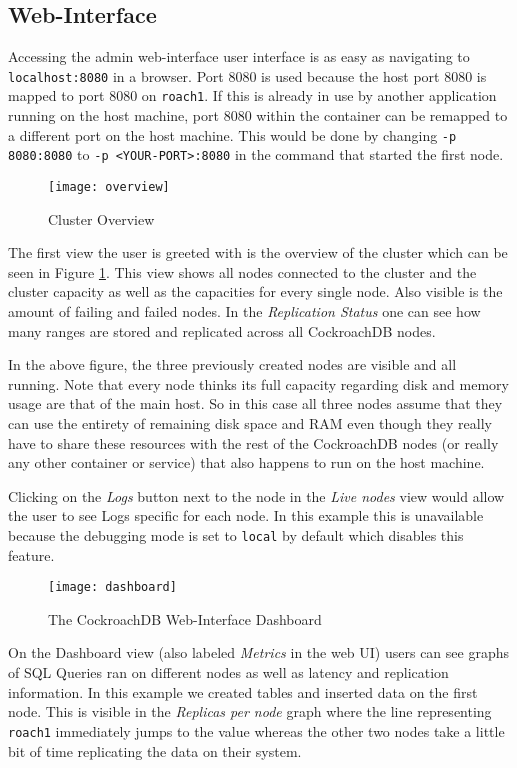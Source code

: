 \subsection{Web-Interface}\label{chap:web-interface}
Accessing the admin web-interface user interface is as easy as navigating to \verb|localhost:8080| in a browser. Port 8080 is used because the host port 8080 is mapped to port 8080 on \verb|roach1|. If this is already in use by another application running on the host machine, port 8080 within the container can be remapped to a different port on the host machine. This would be done by changing \verb|-p 8080:8080| to \verb|-p <YOUR-PORT>:8080| in the command that started the first node.

\begin{figure}[H]
    \texttt{[image: overview]}
    \caption{Cluster Overview}
    \label{fig:overview}
\end{figure}

The first view the user is greeted with is the overview of the cluster which can be seen in Figure \ref{fig:overview}. This view shows all nodes connected to the cluster and the cluster capacity as well as the capacities for every single node.
Also visible is the amount of failing and failed nodes. In the \emph{Replication Status} one can see how many ranges are stored and replicated across all CockroachDB nodes. 

\medskip
In the above figure, the three previously created nodes are visible and all running. Note that every node thinks its full capacity regarding disk and memory usage are that of the main host. So in this case all three nodes assume that they can use the entirety of remaining disk space and RAM even though they really have to share these resources with the rest of the CockroachDB nodes (or really any other container or service) that also happens to run on the host machine.  

\medskip
Clicking on the \emph{Logs} button next to the node in the \emph{Live nodes} view would allow the user to see Logs specific for each node. In this example this is unavailable because the debugging mode is set to \verb|local| by default which disables this feature.

\begin{figure}[H]
    \centering
    \texttt{[image: dashboard]}
    \caption{The CockroachDB Web-Interface Dashboard}
    \label{fig:dashboard}
\end{figure}

On the Dashboard view (also labeled \emph{Metrics} in the web UI) users can see graphs of SQL Queries ran on different nodes as well as latency and replication information.
In this example we created tables and inserted data on the first node. This is visible in the \emph{Replicas per node} graph where the line representing \verb|roach1| immediately jumps to the value whereas the other two nodes take a little bit of time replicating the data on their system. 

